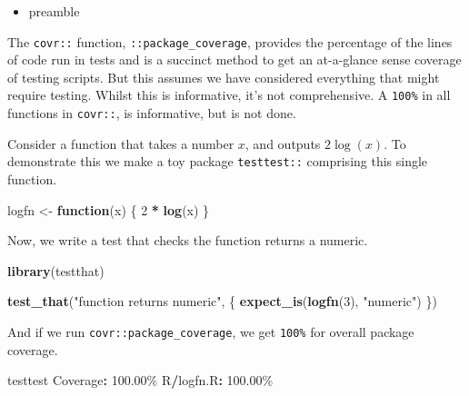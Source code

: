 \documentclass[
]{article}
\newenvironment{Shaded}{\begin{snugshade}}{\end{snugshade}}
\newcommand{\ControlFlowTok}[1]{\textcolor[rgb]{0.13,0.29,0.53}{\textbf{#1}}}
\newcommand{\DecValTok}[1]{\textcolor[rgb]{0.00,0.00,0.81}{#1}}
\newcommand{\FloatTok}[1]{\textcolor[rgb]{0.00,0.00,0.81}{#1}}
\newcommand{\KeywordTok}[1]{\textcolor[rgb]{0.13,0.29,0.53}{\textbf{#1}}}
\newcommand{\NormalTok}[1]{#1}
\newcommand{\OperatorTok}[1]{\textcolor[rgb]{0.81,0.36,0.00}{\textbf{#1}}}
\newcommand{\StringTok}[1]{\textcolor[rgb]{0.31,0.60,0.02}{#1}}
\providecommand{\tightlist}{%
  \setlength{\itemsep}{0pt}\setlength{\parskip}{0pt}}
\begin{document}
\begin{itemize}
\tightlist
\item
  preamble
\end{itemize}

The \texttt{covr::} function, \texttt{::package\_coverage}, provides the
percentage of the lines of code run in tests and is a succinct method to
get an at-a-glance sense coverage of testing scripts. But this assumes
we have considered everything that might require testing. Whilst this is
informative, it's not comprehensive. A \texttt{100\%} in all functions
in \texttt{covr::}, is informative, but is not done.

Consider a function that takes a number \(x\), and outputs \(2\log(x)\).
To demonstrate this we make a toy package \texttt{testtest::} comprising
this single function.

\begin{Shaded}
\begin{Highlighting}[]
\NormalTok{logfn <{-}}\StringTok{ }\ControlFlowTok{function}\NormalTok{(x) \{}
  \DecValTok{2} \OperatorTok{*}\StringTok{ }\KeywordTok{log}\NormalTok{(x)}
\NormalTok{\}}
\end{Highlighting}
\end{Shaded}

Now, we write a test that checks the function returns a numeric.

\begin{Shaded}
\begin{Highlighting}[]
\KeywordTok{library}\NormalTok{(testthat)}

\KeywordTok{test\_that}\NormalTok{(}\StringTok{"function returns numeric"}\NormalTok{, \{}
  \KeywordTok{expect\_is}\NormalTok{(}\KeywordTok{logfn}\NormalTok{(}\DecValTok{3}\NormalTok{), }\StringTok{"numeric"}\NormalTok{)}
\NormalTok{\})}
\end{Highlighting}
\end{Shaded}

And if we run \texttt{covr::package\_coverage}, we get \texttt{100\%}
for overall package coverage.

\begin{Shaded}
\begin{Highlighting}[]
\NormalTok{testtest Coverage}\OperatorTok{:}\StringTok{ }\FloatTok{100.00}\NormalTok{\%}
\NormalTok{R}\OperatorTok{/}\NormalTok{logfn.R}\OperatorTok{:}\StringTok{ }\FloatTok{100.00}\NormalTok{\%}
\end{Highlighting}
\end{Shaded}
\end{document}
